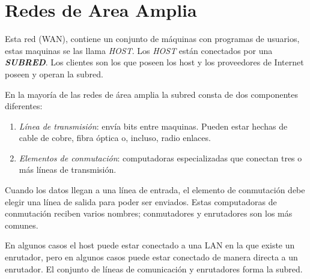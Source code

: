\documentclass[12pt]{report}
\begin{document}



\section*{Redes de Area Amplia}

Esta red (WAN), contiene un conjunto de m\'aquinas con programas de usuarios, estas maquinas se las llama \textit {HOST}. Los \textit {HOST} est\'an conectados por una \textit {\bf SUBRED}. Los clientes son los que poseen los host y los proveedores de Internet poseen y operan la subred.
  
En la mayor\'ia de las redes de \'area amplia la subred consta de dos componentes diferentes: 
\begin{enumerate}

\item \textit {L\'inea de transmisi\'on}: env\'ia bits entre maquinas. Pueden estar hechas de cable de cobre, fibra \'optica o, incluso, radio enlaces. 

\item \textit {Elementos de conmutaci\'on}: computadoras especializadas que conectan tres o m\'as l\'ineas de transmisi\'on.
\end{enumerate}

Cuando los datos llegan a una l\'inea de entrada, el elemento de conmutaci\'on debe elegir una l\'inea de salida para poder ser enviados. Estas computadoras de conmutaci\'on reciben varios nombres; conmutadores y enrutadores son los m\'as comunes.

En algunos casos el host puede estar conectado a una LAN en la que existe un enrutador, pero en algunos casos puede estar conectado de manera directa a un enrutador.  El conjunto de l\'ineas de comunicaci\'on y enrutadores forma la subred.



 
\end{document}
